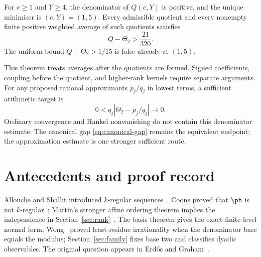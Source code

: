 \documentclass[11pt]{article}
\begin{document}
\begin{theorem}\label{res:rankonefloor}
For $e\ge1$ and $Y\ge4$, the denominator of $Q(e,Y)$ is positive, and the
unique minimiser is $(e,Y)=(1,5)$. Every admissible quotient and every
nonempty finite positive weighted average of such quotients satisfies
\[
 Q-\Theta_2>\frac{21}{320}.
\]
The uniform bound $Q-\Theta_2>1/15$ is false already at $(1,5)$.
\end{theorem}
This theorem treats averages after the quotients are formed. Signed
coefficients, coupling before the quotient, and higher-rank kernels require
separate arguments. For any proposed rational approximants $p_j/q_j$ in
lowest terms, a sufficient arithmetic target is
\[
 0<q_j\left|\Theta_2-p_j/q_j\right|\longrightarrow0.
\]
Ordinary convergence and Hankel nonvanishing do not contain this denominator
estimate. The canonical gap \eqref{eq:canonical-gap} remains the equivalent
endpoint; the approximation estimate is one stronger sufficient route.

\section{Antecedents and proof record}\label{sec:open}
Allouche and Shallit introduced $k$-regular sequences~\cite{allouche-shallit}.
Coons proved that $\ph$ is not $k$-regular~\cite{coons}; Martin's stronger
affine ordering theorem implies the independence in
Section~\ref{sec:rank}~\cite{martin-phi-inequalities}. The basis theorem
gives the exact finite-level normal form. Wong~\cite{wong2015} proved
least-residue irrationality when the denominator base equals the modulus;
Section~\ref{sec:family} fixes base two and classifies dyadic observables.
The original question appears in Erd\H{o}s and Graham~\cite[p.~61]{erdosgraham1980}.
\end{document}
